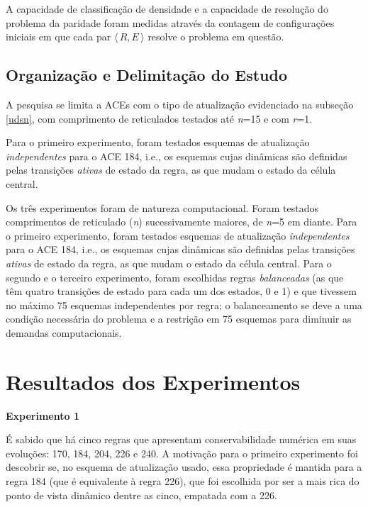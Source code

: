 \documentclass[a4paper,12pt]{ltxdoc}
\newcommand\tab[1][1cm]{\hspace*{#1}}
\begin{document}
\tab A capacidade de classificação de densidade e a capacidade de resolução do problema da paridade foram medidas através da contagem de configurações iniciais em que cada par $\langle\,R,E\,\rangle$ resolve o problema em questão.

\subsection{Organização e Delimitação do Estudo} \label{delimitacao}

A pesquisa se limita a ACEs com o tipo de atualização evidenciado na subseção \ref{udsn}, com comprimento de reticulados testados até \textit{n}=15 e com \textit{r}=1. 

\tab Para o primeiro experimento, foram testados esquemas de atualização \textit{independentes} para o ACE 184, i.e., os esquemas cujas dinâmicas são definidas pelas transições \textit{ativas} de estado da regra, as que mudam o estado da célula central. 

\tab Os três experimentos foram de natureza computacional. Foram testados comprimentos de reticulado (\textit{n}) sucessivamente maiores, de \textit{n}=5 em diante. Para o primeiro experimento, foram testados esquemas de atualização \textit{independentes} para o ACE 184, i.e., os esquemas cujas dinâmicas são definidas pelas transições \textit{ativas} de estado da regra, as que mudam o estado da célula central. Para o segundo e o terceiro experimento, foram escolhidas regras \textit{balanceadas} (as que têm quatro transições de estado para cada um dos estados, 0 e 1) e que tivessem no máximo 75 esquemas independentes por regra; o balanceamento se deve a uma condição necessária do problema e a restrição em 75 esquemas para diminuir as demandas computacionais.

\break
\section{Resultados dos Experimentos} \label{resultados}

\textbf{Experimento 1}

\tab É sabido que há cinco regras que apresentam conservabilidade numérica em suas evoluções: 170, 184, 204, 226 e 240. A motivação para o primeiro experimento foi descobrir se, no esquema de atualização usado, essa propriedade é mantida para a regra 184 (que é equivalente à regra 226), que foi escolhida por ser a mais rica do ponto de vista dinâmico dentre as cinco, empatada com a 226.
\end{document}
